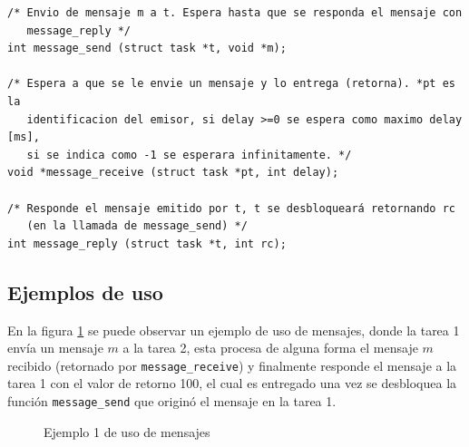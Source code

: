 \begin{lstlisting}
/* Envio de mensaje m a t. Espera hasta que se responda el mensaje con
   message_reply */
int message_send (struct task *t, void *m);

/* Espera a que se le envie un mensaje y lo entrega (retorna). *pt es la
   identificacion del emisor, si delay >=0 se espera como maximo delay [ms],
   si se indica como -1 se esperara infinitamente. */
void *message_receive (struct task *pt, int delay);

/* Responde el mensaje emitido por t, t se desbloqueará retornando rc
   (en la llamada de message_send) */
int message_reply (struct task *t, int rc);
\end{lstlisting}

\subsection{Ejemplos de uso}

En la figura \ref{fig:mensajes_ejemplo_1} se puede observar un ejemplo de uso de
mensajes, donde la tarea 1 envía un mensaje $m$ a la tarea 2, esta procesa de
alguna forma el mensaje $m$ recibido (retornado por \texttt{message\_receive}) y
finalmente responde el mensaje a la tarea 1 con el valor de retorno 100, el cual
es entregado una vez se desbloquea la función \texttt{message\_send} que originó
el mensaje en la tarea 1.

\begin{figure}[htbp]
  \centering
  \caption{Ejemplo 1 de uso de mensajes}
  \label{fig:mensajes_ejemplo_1}
\end{figure}

